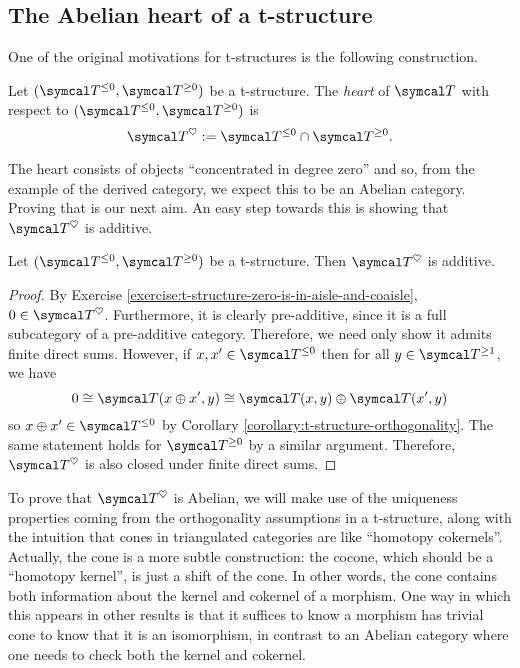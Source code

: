\subsection{The Abelian heart of a t-structure}
One of the original motivations for t-structures is the following construction.

\begin{definition}
	Let \((\calT^{\leq 0},\calT^{\geq 0})\) be a t-structure. The \emph{heart} of \(\calT\) with respect to \((\calT^{\leq 0},\calT^{\geq 0})\) is
	\[ \calT^\heartsuit := \calT^{\leq 0}\cap\calT^{\geq 0}. \]
\end{definition}

The heart consists of objects ``concentrated in degree zero'' and so, from the example of the derived category, we expect this to be an Abelian category. Proving that is our next aim.
An easy step towards this is showing that \(\calT^\heartsuit\) is additive.

\begin{proposition}\label{prop:t-structure-heart-is-additive}
	Let \((\calT^{\leq0},\calT^{\geq0})\) be a t-structure. Then \(\calT^\heartsuit\) is additive.
\end{proposition}
\begin{proof}
By Exercise \ref{exercise:t-structure-zero-is-in-aisle-and-coaisle}, \(0\in\calT^\heartsuit\). Furthermore, it is clearly pre-additive, since it is a full subcategory of a pre-additive category.
Therefore, we need only show it admits finite direct sums. However, if \(x,x'\in\calT^{\leq0}\) then for all \(y\in\calT^{\geq 1}\), we have
\[ 0\cong\calT(x\oplus x',y) \cong \calT(x,y)\oplus\calT(x',y) \]
so \(x\oplus x'\in\calT^{\leq 0}\) by Corollary \ref{corollary:t-structure-orthogonality}. The same statement holds for \(\calT^{\geq 0}\) by a similar argument. Therefore, \(\calT^\heartsuit\) is
also closed under finite direct sums.
\end{proof}

To prove that \(\calT^\heartsuit\) is Abelian, we will make use of the uniqueness properties coming from the orthogonality assumptions in a t-structure, along
with the intuition that cones in triangulated categories are like ``homotopy cokernels''. Actually, the cone is a more subtle construction: the cocone, which should be a ``homotopy kernel'',
is just a shift of the cone. In other words, the cone contains both information about the kernel and cokernel of a morphism. One way in which this appears in other results
is that it suffices to know a morphism has trivial cone to know that it is an isomorphism, in contrast to an Abelian category where one needs to check both the kernel and cokernel.

